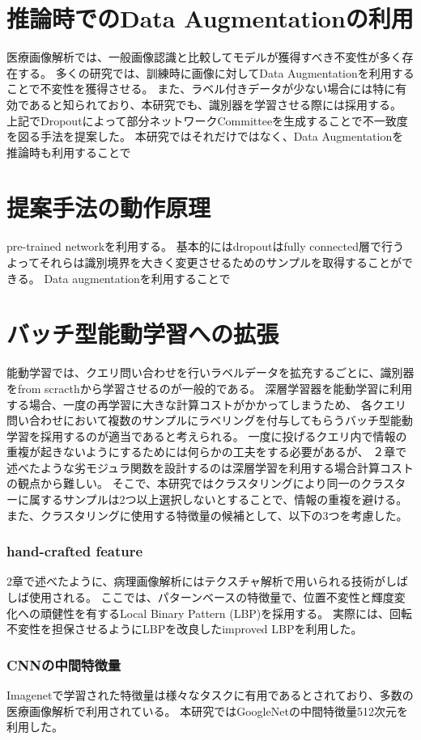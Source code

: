 \section{推論時でのData Augmentationの利用}
医療画像解析では、一般画像認識と比較してモデルが獲得すべき不変性が多く存在する。
多くの研究では、訓練時に画像に対してData Augmentationを利用することで不変性を獲得させる。
また、ラベル付きデータが少ない場合には特に有効であると知られており、本研究でも、識別器を学習させる際には採用する。
上記でDropoutによって部分ネットワークCommitteeを生成することで不一致度を図る手法を提案した。
本研究ではそれだけではなく、Data Augmentationを推論時も利用することで

\section{提案手法の動作原理}
pre-trained networkを利用する。
基本的にはdropoutはfully connected層で行う
よってそれらは識別境界を大きく変更させるためのサンプルを取得することができる。
Data augmentationを利用することで

\section{バッチ型能動学習への拡張}
能動学習では、クエリ問い合わせを行いラベルデータを拡充するごとに、識別器をfrom scracthから学習させるのが一般的である。
深層学習器を能動学習に利用する場合、一度の再学習に大きな計算コストがかかってしまうため、
各クエリ問い合わせにおいて複数のサンプルにラベリングを付与してもらうバッチ型能動学習を採用するのが適当であると考えられる。
一度に投げるクエリ内で情報の重複が起きないようにするためには何らかの工夫をする必要があるが、
２章で述べたような劣モジュラ関数を設計するのは深層学習を利用する場合計算コストの観点から難しい。
そこで、本研究ではクラスタリングにより同一のクラスターに属するサンプルは2つ以上選択しないとすることで、情報の重複を避ける。
また、クラスタリングに使用する特徴量の候補として、以下の3つを考慮した。

\subsubsection{hand-crafted feature}
2章で述べたように、病理画像解析にはテクスチャ解析で用いられる技術がしばしば使用される。
ここでは、パターンベースの特徴量で、位置不変性と輝度変化への頑健性を有するLocal Binary Pattern (LBP)を採用する。
実際には、回転不変性を担保させるようにLBPを改良したimproved LBPを利用した。

\subsubsection{CNNの中間特徴量}
Imagenetで学習された特徴量は様々なタスクに有用であるとされており、多数の医療画像解析で利用されている。
本研究ではGoogleNetの中間特徴量512次元を利用した。

